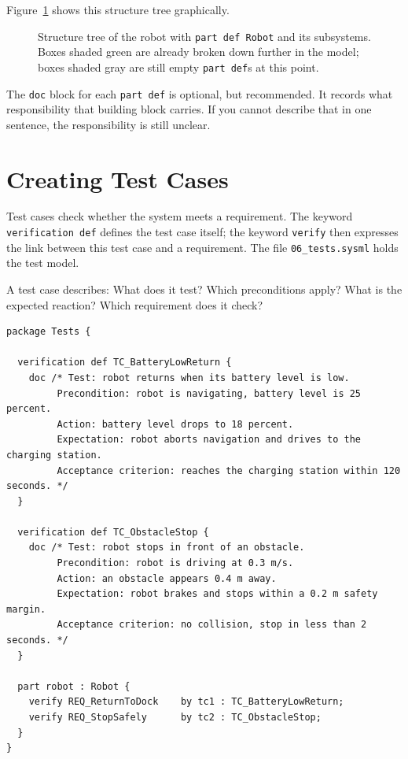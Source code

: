 Figure~\ref{fig:struktur-robot} shows this structure tree graphically.

\begin{figure}[H]
  \centering
  \caption{Structure tree of the robot with \texttt{part def Robot} and its
    subsystems. Boxes shaded green are already broken down further in the
    model; boxes shaded gray are still empty \texttt{part def}s at this point.}
  \label{fig:struktur-robot}
\end{figure}

The \texttt{doc} block for each \texttt{part def} is optional, but recommended. It records what responsibility that building block carries. If you cannot describe that in one sentence, the responsibility is still unclear.

\section{Creating Test Cases}

Test cases check whether the system meets a requirement. The keyword \texttt{verification def} defines the test case itself; the keyword \texttt{verify} then expresses the link between this test case and a requirement. The file \texttt{06\_tests.sysml} holds the test model.

A test case describes: What does it test? Which preconditions apply? What is the expected reaction? Which requirement does it check?

\begin{lstlisting}
package Tests {

  verification def TC_BatteryLowReturn {
    doc /* Test: robot returns when its battery level is low.
         Precondition: robot is navigating, battery level is 25 percent.
         Action: battery level drops to 18 percent.
         Expectation: robot aborts navigation and drives to the charging station.
         Acceptance criterion: reaches the charging station within 120 seconds. */
  }

  verification def TC_ObstacleStop {
    doc /* Test: robot stops in front of an obstacle.
         Precondition: robot is driving at 0.3 m/s.
         Action: an obstacle appears 0.4 m away.
         Expectation: robot brakes and stops within a 0.2 m safety margin.
         Acceptance criterion: no collision, stop in less than 2 seconds. */
  }

  part robot : Robot {
    verify REQ_ReturnToDock    by tc1 : TC_BatteryLowReturn;
    verify REQ_StopSafely      by tc2 : TC_ObstacleStop;
  }
}
\end{lstlisting}


